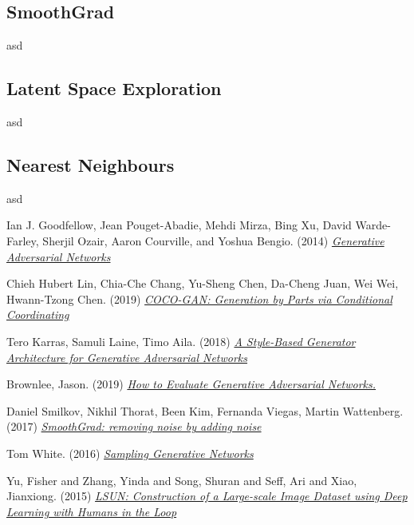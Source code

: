 \documentclass[12pt]{article}
\begin{document}
\begin{multicols*}{2}
        \subsection{SmoothGrad}
        \label{subsec:smoothgrad}
        asd
        \subsection{Latent Space Exploration}
        \label{subsec:latentSpaceExploration}
        asd
        \subsection{Nearest Neighbours}
        \label{subsec:nearestneighbours}
        asd
    \end{multicols*}
    \newpage
    \begin{thebibliography}{9}
        Ian J. Goodfellow, Jean Pouget-Abadie, Mehdi Mirza, Bing Xu, David Warde-Farley, Sherjil Ozair, Aaron Courville, and Yoshua Bengio. (2014)
        \href{https://papers.nips.cc/paper/2014/file/5ca3e9b122f61f8f06494c97b1afccf3-Paper.pdf}{\textit{Generative Adversarial Networks} }

        Chieh Hubert Lin, Chia-Che Chang, Yu-Sheng Chen, Da-Cheng Juan, Wei Wei, Hwann-Tzong Chen. (2019)
        \href{https://arxiv.org/pdf/1904.00284.pdf}{\textit{COCO-GAN: Generation by Parts via Conditional Coordinating} }

        Tero Karras, Samuli Laine, Timo Aila. (2018)
        \href{https://arxiv.org/pdf/1812.04948.pdf}{\textit{A Style-Based Generator Architecture for Generative Adversarial Networks} }

        Brownlee, Jason. (2019)
        \href{https://machinelearningmastery.com/how-to-evaluate-generative-adversarial-networks/}{\textit{How to Evaluate Generative Adversarial Networks.} }

        Daniel Smilkov, Nikhil Thorat, Been Kim, Fernanda Viegas, Martin Wattenberg. (2017)
        \href{https://arxiv.org/pdf/1706.03825.pdf}{\textit{SmoothGrad: removing noise by adding noise} }

        Tom White. (2016)
        \href{https://arxiv.org/pdf/1609.04468.pdf}{\textit{Sampling Generative Networks} }

        Yu, Fisher and Zhang, Yinda and Song, Shuran and Seff, Ari and Xiao, Jianxiong. (2015)
        \href{https://arxiv.org/pdf/1506.03365.pdf}{\textit{LSUN: Construction of a Large-scale Image Dataset using Deep Learning with Humans in the Loop}}


\end{thebibliography}
\end{document}
